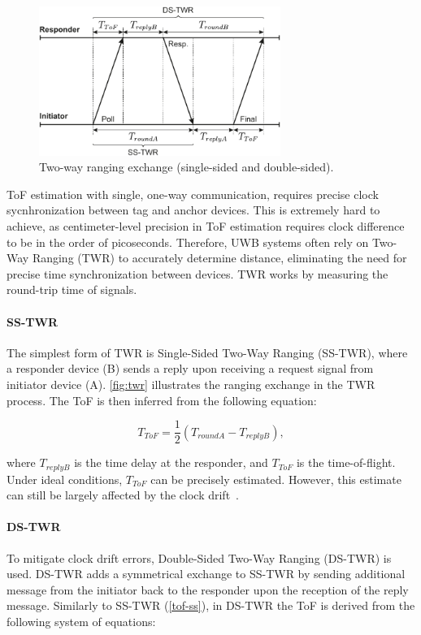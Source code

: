 \begin{figure}[tbh]
\includegraphics[width=0.7\textwidth]{Graphics/twr.pdf}
\centering
\caption[Two-way ranging exchange.]{Two-way ranging exchange (single-sided and double-sided).}
\label{fig:twr}
\end{figure}

ToF estimation with single, one-way communication, requires precise clock sycnhronization between tag and anchor devices. This is extremely hard to achieve, as centimeter-level precision in ToF estimation requires clock difference to be in the order of picoseconds. Therefore, UWB systems often rely on Two-Way Ranging (TWR) to accurately determine distance, eliminating the need for precise time synchronization between devices. TWR works by measuring the round-trip time of signals.

\paragraph{SS-TWR}
The simplest form of TWR is Single-Sided Two-Way Ranging (SS-TWR), where a responder device (B) sends a reply upon receiving a request signal from initiator device (A). \autoref{fig:twr} illustrates the ranging exchange in the TWR process. The ToF is then inferred from the following equation:

\begin{equation}\label{tof-ss}
T_{ToF} = \frac{1}{2} (T_{roundA} - T_{replyB}),
\end{equation}

where $T_{replyB}$ is the time delay at the responder, and $T_{ToF}$ is the time-of-flight. Under ideal conditions, $T_{ToF}$ can be precisely estimated. However, this estimate can still be largely affected by the clock drift~\cite{neirynck2016alternative}.

\paragraph{DS-TWR} 
To mitigate clock drift errors, Double-Sided Two-Way Ranging (DS-TWR) is used. DS-TWR adds a symmetrical exchange to SS-TWR by sending additional message from the initiator back to the responder upon the reception of the reply message. Similarly to SS-TWR (\autoref{tof-ss}), in DS-TWR the ToF is derived from the following system of equations: 

